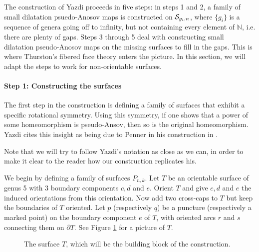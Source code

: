 The construction of Yazdi proceeds in five steps: in steps 1 and 2, a family of small dilatation psuedo-Anosov
maps is constructed on $\mathcal{S}_{g_i,n}$, where $\{g_i\}$ is a sequence of genera going off to infinity, but not
containing every element of $\mathbb{N}$, i.e. there are plenty of gaps. Steps 3 through 5 deal with constructing small dilatation pseudo-Anosov maps on the missing surfaces to fill in the gaps. This is where
Thurston's fibered face theory enters the picture. In this section, we will adapt the steps to work for
non-orientable surfaces.

\paragraph{Step 1: Constructing the surfaces}

The first step in the construction is defining a family of surfaces that exhibit a specific rotational
symmetry. Using this symmetry, if one shows that a power of some homeomorphism is pseudo-Ansov, then so is
the original homeomorphism. Yazdi cites this insight as being due to Penner in his construction in
\cite{penner1991bounds}.

Note that we will try to follow Yazdi's notation as close as we can, in order to make it clear to the reader
how our construction replicates his.

We begin by defining a family of surfaces $P_{n,k}$. Let $T$ be an orientable surface of genus 5 with 3
boundary components $c,d$ and $e$. Orient $T$ and give $c,d$ and $e$ the induced orientations from this
orientation. Now add two cross-caps to $T$ but keep the boundaries of $T$ oriented. Let $p$ (respectively $q$)
be a puncture (respectively a marked point) on the boundary component $e$ of $T$, with oriented arcs $r$ and
$s$ connecting them on $\partial T$. See Figure \ref{fig:buildingblock} for a picture of $T$.

\begin{figure}[]
    \centering
    \caption{The surface $T$, which will be the building block of the construction.}
    \label{fig:buildingblock}
\end{figure}

